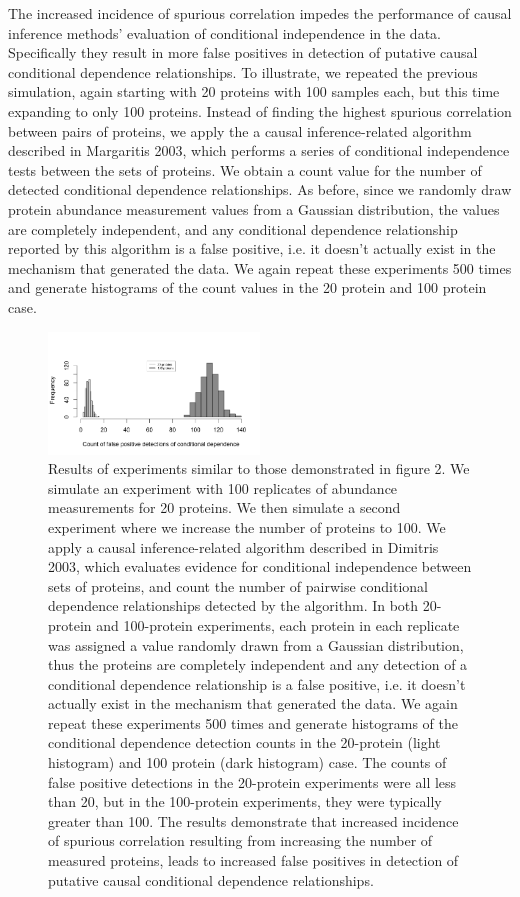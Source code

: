 \documentclass[journal=jacsat,manuscript=article]{achemso}
\begin{document}
The increased incidence of spurious correlation impedes the performance of causal inference methods’ evaluation of conditional independence in the data.  Specifically they result in more false positives in detection of putative causal conditional dependence relationships. To illustrate, we repeated the previous simulation, again starting with 20 proteins with 100 samples each, but this time expanding to only 100 proteins.  Instead of finding the highest  spurious correlation between pairs of proteins, we apply the a causal inference-related algorithm described in Margaritis 2003, which performs a series of conditional independence tests between the sets of proteins.  We obtain a count value for the number of detected conditional dependence relationships.  As before, since we randomly draw protein abundance measurement values from a Gaussian distribution, the values are completely independent, and any conditional dependence relationship reported by this algorithm is a false positive, i.e. it doesn't actually exist in the mechanism that generated the data.  We again repeat these experiments 500 times and generate histograms of the count values in the 20 protein and 100 protein case. 

\begin{figure}[!tpb]
\centerline{\includegraphics[width=0.5\textwidth]{figs/spurious_dep.png}}
\caption{Results of experiments similar to those demonstrated in figure 2.  We simulate an experiment with 100 replicates of abundance measurements for 20 proteins.  We then simulate a second experiment where we increase the number of proteins to 100.  We apply a causal inference-related algorithm described in Dimitris 2003, which evaluates evidence for conditional independence between sets of proteins, and count the number of pairwise conditional dependence relationships detected by the algorithm.  In both 20-protein and 100-protein experiments, each protein in each replicate was assigned a value randomly drawn from a Gaussian distribution, thus the proteins are completely independent and any detection of a conditional dependence relationship is a false positive, i.e. it doesn't actually exist in the mechanism that generated the data.  We again repeat these experiments 500 times and generate histograms of the conditional dependence detection counts in the 20-protein (light histogram) and 100 protein (dark histogram) case.  The counts of false positive detections in the 20-protein experiments were all less than 20, but in the 100-protein experiments, they were typically greater than 100.  The results demonstrate that increased incidence of spurious correlation resulting from increasing the number of measured proteins, leads to increased false positives in detection of putative causal conditional dependence relationships.}
\label{spur_dep}
\end{figure}
\end{document}
